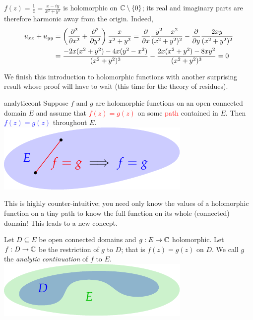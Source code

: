\begin{example}{}{}
	$f(z)=\frac 1z=\frac{x-iy}{x^2+y^2}$ is holomorphic on $\C\setminus\{0\}$; its real and imaginary parts are therefore harmonic away from the origin. Indeed,
	\begin{align*}
		u_{xx}+u_{yy}&=\left(\partials[^2]{x^2}+\partials[^2]{y^2}\right)\frac x{x^2+y^2}
		=\partials x\frac{y^2-x^2}{(x^2+y^2)^2}-\partials y\frac{2xy}{(x^2+y^2)^2}\\
		&=\frac{-2x(x^2+y^2)-4x(y^2-x^2)}{(x^2+y^2)^3}-\frac{2x(x^2+y^2)-8xy^2}{(x^2+y^2)^3}
		=0
	\end{align*}
\end{example}
\goodbreak


We finish this introduction to holomorphic functions with another surprising result whose proof will have to wait (this time for the theory of residues).

\begin{thm}[lower separated=false, sidebyside, sidebyside align=top seam, sidebyside gap=0pt, righthand width=0.38\linewidth]{}{analyticcont}
	Suppose $f$ and $g$ are holomorphic functions on an open connected domain $E$ and assume that \textcolor{red}{$f(z)=g(z)$} on some \textcolor{red}{path} contained in $E$.\smallbreak
	Then \textcolor{blue}{$f(z)=g(z)$} throughout $E$.
	\tcblower
	\flushright\includegraphics{analytic-topology2}
\end{thm}

This is highly counter-intuitive; you need only know the values of a holomorphic function on a tiny path to know the full function on its whole (connected) domain! This leads to a new concept.

\begin{defn}[lower separated=false, sidebyside, sidebyside align=top seam, sidebyside gap=0pt, righthand width=0.38\linewidth]{}{}
	Let $D\subseteq E$ be open connected domains and $g:E\to \C$ holomorphic. Let $f:D\to\C$ be the restriction of $g$ to $D$; that is $f(z)=g(z)$ on $D$.\smallbreak
	We call $g$ the \emph{analytic continuation} of $f$ to $E$.\tcblower
	\flushright\includegraphics{analytic-topology3}
\end{defn}

